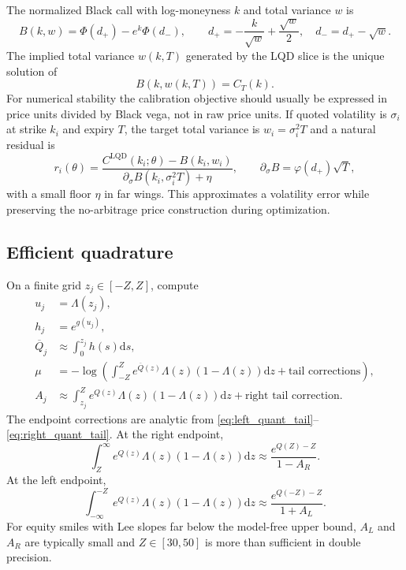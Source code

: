 \documentclass[11pt]{article}
\newcommand{\dd}{\mathrm{d}}
\newcommand{\1}{\mathbf{1}}
\newcommand{\PhiN}{\Phi}
\newcommand{\phin}{\varphi}
\begin{document}
The normalized Black call with log-moneyness $k$ and total variance $w$ is
\begin{equation}
    B(k,w)=\PhiN(d_+)-e^k\PhiN(d_-),\qquad
    d_+=-\frac{k}{\sqrt w}+\frac{\sqrt w}{2},
    \quad d_-=d_+-\sqrt w. \label{eq:black}
\end{equation}
The implied total variance $w(k,T)$ generated by the LQD slice is the unique solution of
\begin{equation}
    B(k,w(k,T))=C_T(k).\label{eq:impw}
\end{equation}
For numerical stability the calibration objective should usually be expressed in price units divided by Black vega, not in raw price units.  If quoted volatility is $\sigma_i$ at strike $k_i$ and expiry $T$, the target total variance is $w_i=\sigma_i^2T$ and a natural residual is
\begin{equation}
    r_i(\theta)=\frac{C^{\mathrm{LQD}}(k_i;\theta)-B(k_i,w_i)}{\partial_\sigma B(k_i,\sigma_i^2T)+\eta},\qquad
    \partial_\sigma B=\phin(d_+)\sqrt T,\label{eq:vega_resid}
\end{equation}
with a small floor $\eta$ in far wings.  This approximates a volatility error while preserving the no-arbitrage price construction during optimization.

\subsection{Efficient quadrature}

On a finite grid $z_j\in[-Z,Z]$, compute
\begin{align}
    u_j&=\Lambda(z_j),\\
    h_j&=e^{g(u_j)},\\
    \overline Q_j&\approx\int_0^{z_j}h(s)\dd s,\\
    \mu&=-\log\left(\int_{-Z}^{Z}e^{\overline Q(z)}\Lambda(z)(1-\Lambda(z))\dd z+\text{tail corrections}\right),\\
    A_j&\approx\int_{z_j}^{Z}e^{Q(z)}\Lambda(z)(1-\Lambda(z))\dd z+\text{right tail correction}.
\end{align}
The endpoint corrections are analytic from \eqref{eq:left_quant_tail}--\eqref{eq:right_quant_tail}.  At the right endpoint,
\begin{equation}
    \int_Z^\infty e^{Q(z)}\Lambda(z)(1-\Lambda(z))\dd z
    \approx \frac{e^{Q(Z)-Z}}{1-A_R}.\label{eq:right_tail_corr}
\end{equation}
At the left endpoint,
\begin{equation}
    \int_{-\infty}^{-Z} e^{Q(z)}\Lambda(z)(1-\Lambda(z))\dd z
    \approx \frac{e^{Q(-Z)-Z}}{1+A_L}.\label{eq:left_tail_corr}
\end{equation}
For equity smiles with Lee slopes far below the model-free upper bound, $A_L$ and $A_R$ are typically small and $Z\in[30,50]$ is more than sufficient in double precision.
\end{document}
